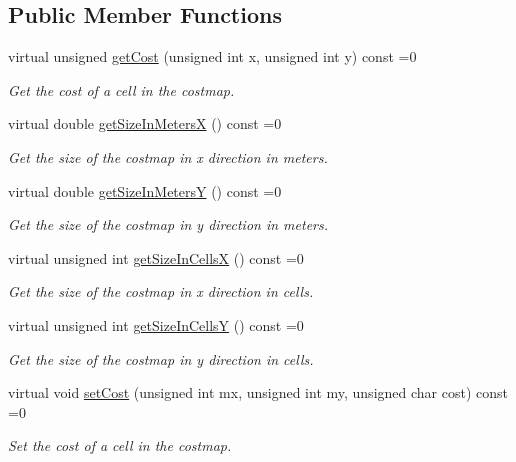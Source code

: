 \subsection*{Public Member Functions}
\begin{DoxyCompactItemize}
\item 
virtual unsigned \hyperlink{classquadtree__planner_1_1Costmap_ada8d9915ad1b73637730fe65be8d291d}{get\+Cost} (unsigned int x, unsigned int y) const =0
\begin{DoxyCompactList}\small\item\em Get the cost of a cell in the costmap. \end{DoxyCompactList}\item 
virtual double \hyperlink{classquadtree__planner_1_1Costmap_a86720bf9d3de86f59af0229d706763c1}{get\+Size\+In\+MetersX} () const =0
\begin{DoxyCompactList}\small\item\em Get the size of the costmap in x direction in meters. \end{DoxyCompactList}\item 
virtual double \hyperlink{classquadtree__planner_1_1Costmap_ac0767c6851d243d8d12a8a0dbd2d022b}{get\+Size\+In\+MetersY} () const =0
\begin{DoxyCompactList}\small\item\em Get the size of the costmap in y direction in meters. \end{DoxyCompactList}\item 
virtual unsigned int \hyperlink{classquadtree__planner_1_1Costmap_aa78086776637e7472d5ca8ae44f5c2f0}{get\+Size\+In\+CellsX} () const =0
\begin{DoxyCompactList}\small\item\em Get the size of the costmap in x direction in cells. \end{DoxyCompactList}\item 
virtual unsigned int \hyperlink{classquadtree__planner_1_1Costmap_a5c07589004856b158dbbe38470562bfe}{get\+Size\+In\+CellsY} () const =0
\begin{DoxyCompactList}\small\item\em Get the size of the costmap in y direction in cells. \end{DoxyCompactList}\item 
virtual void \hyperlink{classquadtree__planner_1_1Costmap_a5384641291709625c2215144e97cf69c}{set\+Cost} (unsigned int mx, unsigned int my, unsigned char cost) const =0
\begin{DoxyCompactList}\small\item\em Set the cost of a cell in the costmap. \end{DoxyCompactList}\item 

\end{DoxyCompactItemize}
